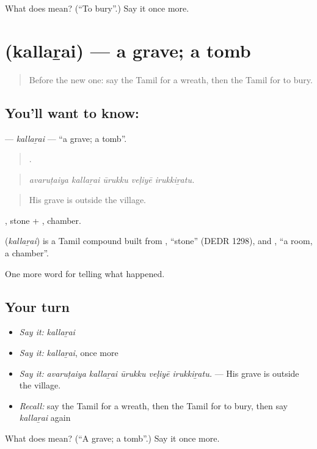 \begin{tcolorbox}[breakable,colback=teal!4,colframe=teal!35!black,title={Before you move on}]
What does  mean? (\textquotedblleft{}To bury\textquotedblright{}.) Say it once more.
\end{tcolorbox}
\section[\texorpdfstring{\ta{கல்லறை} (kallaṟai)}{கல்லறை (kallaṟai)}]{ (kallaṟai) — a grave; a tomb}

\label{lesson:TA-C323-kallarai}



\begin{quote}
Before the new one: say the Tamil for a wreath, then the Tamil for to bury.
\end{quote}

\subsection*{You'll want to know: }
\textbf{} — \emph{kallaṟai} — \textquotedblleft{}a grave; a tomb\textquotedblright{}.

\begin{quote}
    .
\end{quote}

\begin{quote}
\emph{avaruṭaiya kallaṟai ūrukku veḷiyē irukkiṟatu.}
\end{quote}

\begin{quote}
His grave is outside the village.
\end{quote}

, stone + , chamber.

\begin{cousinweb}
\textbf{} (\emph{kallaṟai}) is a Tamil compound built from , \textquotedblleft{}stone\textquotedblright{} (DEDR 1298), and , \textquotedblleft{}a room, a chamber\textquotedblright{}.
\end{cousinweb}

\begin{grammarlens}[title={What you've built}]
One more word for telling what happened.
\end{grammarlens}

\subsection*{Your turn}
\begin{itemize}
\raggedright
  \item \emph{Say it:} \emph{kallaṟai}
  \item \emph{Say it:} \emph{kallaṟai}, once more
  \item \emph{Say it:} \emph{avaruṭaiya kallaṟai ūrukku veḷiyē irukkiṟatu.} — His grave is outside the village.
  \item \emph{Recall:} say the Tamil for a wreath, then the Tamil for to bury, then say \emph{kallaṟai} again
\end{itemize}

\begin{tcolorbox}[breakable,colback=teal!4,colframe=teal!35!black,title={Before you move on}]
What does  mean? (\textquotedblleft{}A grave; a tomb\textquotedblright{}.) Say it once more.
\end{tcolorbox}
